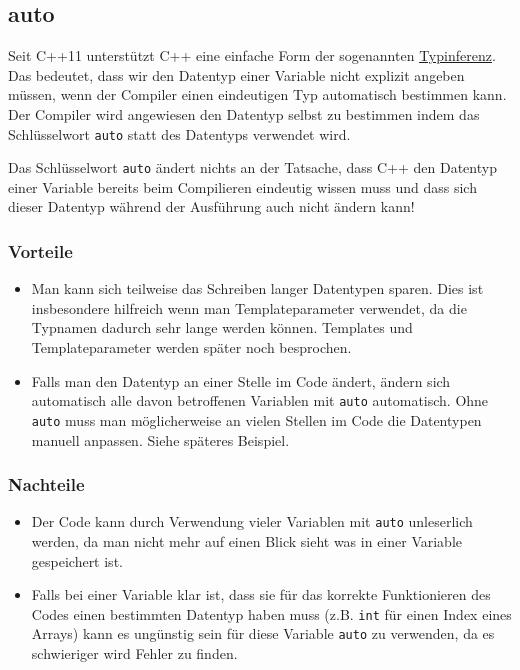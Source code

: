 \documentclass[11pt]{article}
\begin{document}
\subsection{auto}
\label{sec-4-5}
Seit C++11 unterstützt C++ eine einfache Form der sogenannten
\href{https://de.wikipedia.org/wiki/Typinferenz}{Typinferenz}. Das bedeutet, dass wir den Datentyp einer Variable nicht
explizit angeben müssen, wenn der Compiler einen eindeutigen Typ
automatisch bestimmen kann. Der Compiler wird angewiesen den Datentyp
selbst zu bestimmen indem das Schlüsselwort \verb~auto~ statt des Datentyps
verwendet wird.

Das Schlüsselwort \verb~auto~ ändert nichts an der Tatsache, dass C++ den
Datentyp einer Variable bereits beim Compilieren eindeutig wissen muss
und dass sich dieser Datentyp während der Ausführung auch nicht ändern
kann!
\subsubsection{Vorteile}
\label{sec-4-5-1}
\begin{itemize}
\item Man kann sich teilweise das Schreiben langer Datentypen sparen. Dies
ist insbesondere hilfreich wenn man Templateparameter verwendet, da
die Typnamen dadurch sehr lange werden können. Templates und
Templateparameter werden später noch besprochen.
\item Falls man den Datentyp an einer Stelle im Code ändert, ändern sich
automatisch alle davon betroffenen Variablen mit \verb~auto~ automatisch.
Ohne \verb~auto~ muss man möglicherweise an vielen Stellen im Code die
Datentypen manuell anpassen. Siehe späteres Beispiel.
\end{itemize}
\subsubsection{Nachteile}
\label{sec-4-5-2}
\begin{itemize}
\item Der Code kann durch Verwendung vieler Variablen mit \verb~auto~
unleserlich werden, da man nicht mehr auf einen Blick sieht was in
einer Variable gespeichert ist.
\item Falls bei einer Variable klar ist, dass sie für das korrekte
Funktionieren des Codes einen bestimmten Datentyp haben muss (z.B.
\verb~int~ für einen Index eines Arrays) kann es ungünstig sein für diese
Variable \verb~auto~ zu verwenden, da es schwieriger wird Fehler zu
finden.
\end{itemize}
\end{document}
